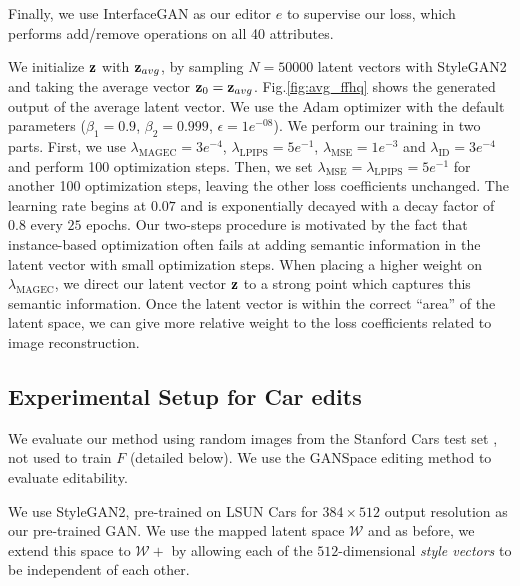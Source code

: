     
Finally, we use InterfaceGAN 
\citep{shen2020} as our editor $e$ to supervise our \magec loss, 
which performs 
add/remove operations on all 40 attributes. 


We initialize $\mathbf{z}$ with $\mathbf{z}_{avg}$, by sampling 
$N = 50000$ latent vectors with StyleGAN2 and taking the average vector $\mathbf{z}_0 = \mathbf{z}_{avg}$. 
Fig.\ref{fig:avg_ffhq} shows the generated output of the average latent vector.
We use the Adam optimizer \citep{adam} with the default parameters 
($\beta_1=0.9$, $\beta_2=0.999$, $\epsilon=1e^{-08}$). We perform our training in two
 parts. First,
we use $\lambda_{\text{MAGEC}} = 3e^{-4}$, $\lambda_{\text{LPIPS}} = 5e^{-1}$, 
$\lambda_{\text{MSE}} = 1e^{-3}$ and $\lambda_{\text{ID}} = 3e^{-4}$ and perform 100 
optimization
 steps. Then, we set $\lambda_{\text{MSE}} =  \lambda_{\text{LPIPS}} = 5e^{-1}$ for another 
 100 
 optimization steps, leaving the other loss coefficients unchanged. The learning rate 
 begins at $0.07$ and is exponentially decayed with a decay factor of $0.8$ every 
 $25$ epochs. Our two-steps procedure is motivated by the fact that 
 instance-based optimization often fails at adding semantic information
  in the 
 latent vector with small optimization steps. When placing a higher weight 
 on
  $\lambda_{\text{MAGEC}}$, we direct our latent vector $\mathbf{z}$ to a strong point which 
  captures 
  this semantic information. Once the latent vector is within the correct 
  ``area'' of 
  the latent space, we can give more relative weight to the loss coefficients 
  related 
  to image reconstruction.



 \subsection{Experimental Setup for Car edits}

 We evaluate  our method using random 
 images from the Stanford Cars test set \citep{stanford_cars}, not 
 used to train $F$ (detailed below). We use the GANSpace 
 \citep{harkonen2020ganspace}
  editing method to evaluate editability.

We use StyleGAN2, pre-trained on LSUN Cars for $384 \times 512$ output resolution
as our
pre-trained GAN. We use the mapped latent space $\mathcal{W}$ and as before,
we extend this
space to $\mathcal{W+}$ by allowing each of the $512$-dimensional \emph{style vectors}
  to be independent of each other. 


